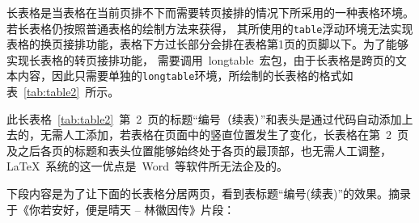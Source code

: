 长表格是当表格在当前页排不下而需要转页接排的情况下所采用的一种表格环境。若长表格仍按照普通表格的绘制方法来获得，
其所使用的\verb|table|浮动环境无法实现表格的换页接排功能，表格下方过长部分会排在表格第1页的页脚以下。为了能够实现长表格的转页接排功能，
需要调用~longtable~宏包，由于长表格是跨页的文本内容，因此只需要单独的\verb|longtable|环境，所绘制的长表格的格式如表~\ref{tab:table2}~所示。

此长表格~\ref{tab:table2}~第~2~页的标题“编号（续表）”和表头是通过代码自动添加上去的，无需人工添加，若表格在页面中的竖直位置发生了变化，长表格在第~2~页
及之后各页的标题和表头位置能够始终处于各页的最顶部，也无需人工调整，\LaTeX~系统的这一优点是~Word~等软件所无法企及的。

下段内容是为了让下面的长表格分居两页，看到表标题“编号(续表)”的效果。摘录于《你若安好，便是晴天 -- 林徽因传》片段：

